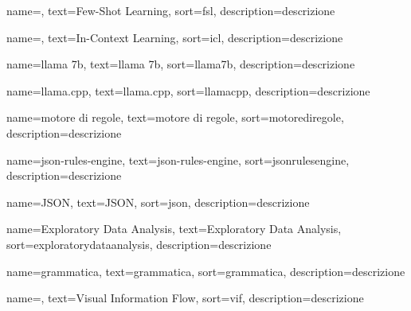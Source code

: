  {
    name=,
    text=Few-Shot Learning,
    sort=fsl,
    description={descrizione}
}

 {
    name=,
    text=In-Context Learning,
    sort=icl,
    description={descrizione}
}

 {
    name=llama 7b,
    text=llama 7b,
    sort=llama7b,
    description={descrizione}
}

 {
    name=llama.cpp,
    text=llama.cpp,
    sort=llamacpp,
    description={descrizione}
}

 {
    name=motore di regole,
    text=motore di regole,
    sort=motorediregole,
    description={descrizione}
}

 {
    name=json-rules-engine,
    text=json-rules-engine,
    sort=jsonrulesengine,
    description={descrizione}
}

 {
    name=JSON,
    text=JSON,
    sort=json,
    description={descrizione}
}

 {
    name=Exploratory Data Analysis,
    text=Exploratory Data Analysis,
    sort=exploratorydataanalysis,
    description={descrizione}
}

 {
    name=grammatica,
    text=grammatica,
    sort=grammatica,
    description={descrizione}
}

 {
    name=,
    text=Visual Information Flow,
    sort=vif,
    description={descrizione}
}